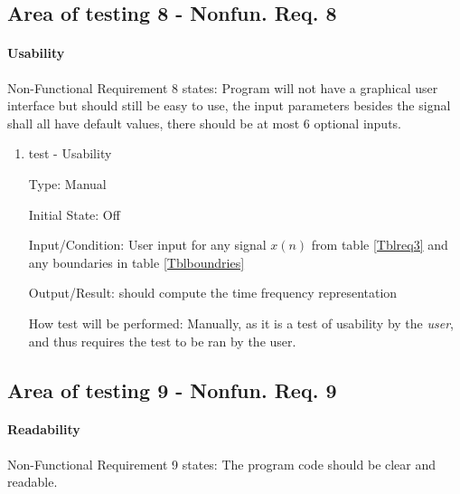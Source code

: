 \documentclass[12pt, titlepage]{article}
\begin{document}
\subsection{Area of testing 8 - Nonfun. Req. 8} \label{test_usability}
\paragraph{Usability}

Non-Functional Requirement 8 states: Program will not have a graphical user interface but should still be easy to use, the input parameters besides the signal shall all have default values, there should be at most 6 optional inputs.

\begin{enumerate}

\item{test - Usability\\}

Type: Manual
					
Initial State: Off
					
Input/Condition: User input for any signal $x(n)$ from table \ref{Tblreq3} and any boundaries in table \ref{Tblboundries}
					
Output/Result: \progname{} should compute the time frequency representation
					
How test will be performed: Manually, as it is a test of usability by the \emph{user}, and thus requires the test to be ran by the user.
					
\end{enumerate}

\subsection{Area of testing 9 - Nonfun. Req. 9} \label{test_readability}
\paragraph{Readability}

Non-Functional Requirement 9 states: The program code should be clear and readable.
\end{document}
